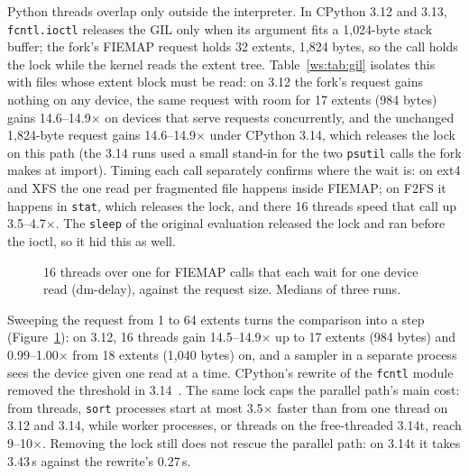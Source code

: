 \begin{table}[t]
\caption{Speedup of 16 threads over one for FIEMAP calls that each wait for one device
read (200 files with 16 extents, cold), by request size and interpreter; 3.14t has no
GIL. Medians of five passes.}
\label{ws:tab:gil}
\small
\setlength{\tabcolsep}{4pt}
\end{table}

Python threads overlap only outside the interpreter. In CPython 3.12 and 3.13,
\texttt{fcntl.ioctl} releases the GIL only when its argument fits a 1{,}024-byte stack
buffer; the fork's FIEMAP request holds 32 extents, 1{,}824 bytes, so the call holds the
lock while the kernel reads the extent tree. Table~\ref{ws:tab:gil} isolates this with
files whose extent block must be read: on 3.12 the fork's request gains nothing on any
device, the same request with room for 17 extents (984 bytes) gains 14.6--14.9$\times$ on
devices that serve requests concurrently, and the unchanged 1{,}824-byte request gains
14.6--14.9$\times$ under CPython 3.14, which releases the lock on this path (the 3.14
runs used a small stand-in for the two \texttt{psutil} calls the fork makes at import). Timing each
call separately confirms where the wait is: on ext4 and XFS the one read per fragmented
file happens inside FIEMAP; on F2FS it happens in \texttt{stat}, which releases the lock,
and there 16 threads speed that call up 3.5--4.7$\times$. The \texttt{sleep} of the
original evaluation released the lock and ran before the ioctl, so it hid this as well.

\begin{figure}[t]
\centering
{}
\caption{16 threads over one for FIEMAP calls that each wait for one device read
(dm-delay), against the request size. Medians of three runs.}
\label{ws:fig:step}
\end{figure}

Sweeping the request from 1 to 64 extents turns the comparison into a step
(Figure~\ref{ws:fig:step}): on 3.12, 16 threads gain 14.5--14.9$\times$ up to 17 extents
(984 bytes) and 0.99--1.00$\times$ from 18 extents (1{,}040 bytes) on, and a sampler in a
separate process sees the device given one read at a time. CPython's rewrite of the
\texttt{fcntl} module removed the threshold in 3.14~\cite{cpython132742}. The same lock
caps the parallel path's main cost: from threads, \texttt{sort} processes start at most
3.5$\times$ faster than from one thread on 3.12 and 3.14, while worker processes, or
threads on the free-threaded 3.14t, reach 9--10$\times$. Removing the lock still does not
rescue the parallel path: on 3.14t it takes 3.43\,s against the rewrite's 0.27\,s.

